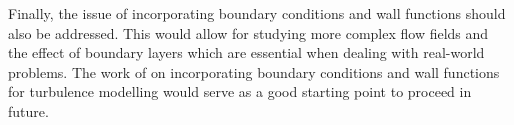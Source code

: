 Finally, the issue of incorporating boundary conditions and wall functions should also be addressed. This would allow for studying more complex flow fields and the effect of boundary layers which are essential when dealing with real-world problems. The work of \cite{Mayrhofer2014} on incorporating boundary conditions and wall functions for turbulence modelling would serve as a good starting point to proceed in future.
